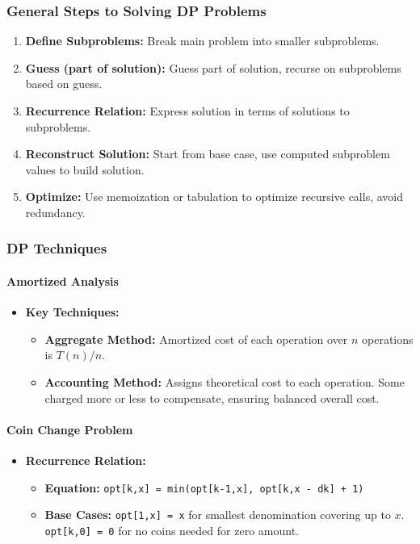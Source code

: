 \documentclass[landscape,7pt]{extarticle}
\begin{document}
\begin{multicols*}{3}
\subsubsection*{General Steps to Solving DP Problems}
\begin{enumerate}
\item \textbf{Define Subproblems:} Break main problem into smaller subproblems.
\item \textbf{Guess (part of solution):} Guess part of solution, recurse on subproblems based on guess.
\item \textbf{Recurrence Relation:} Express solution in terms of solutions to subproblems.
\item \textbf{Reconstruct Solution:} Start from base case, use computed subproblem values to build solution.
\item \textbf{Optimize:} Use memoization or tabulation to optimize recursive calls, avoid redundancy.
\end{enumerate}

\subsubsection*{DP Techniques}

\paragraph{Amortized Analysis}
\begin{itemize}
\item \textbf{Key Techniques:}
\begin{itemize}
\item \textbf{Aggregate Method:} Amortized cost of each operation over $n$ operations is $T(n)/n$.
\item \textbf{Accounting Method:} Assigns theoretical cost to each operation. Some charged more or less to compensate, ensuring balanced overall cost.
\end{itemize}
\end{itemize}

\paragraph{Coin Change Problem}
\begin{itemize}
\item \textbf{Recurrence Relation:}
\begin{itemize}
\item \textbf{Equation:} \texttt{opt[k,x] = min(opt[k-1,x], opt[k,x - dk] + 1)}
\item \textbf{Base Cases:} \texttt{opt[1,x] = x} for smallest denomination covering up to $x$. \texttt{opt[k,0] = 0} for no coins needed for zero amount.
\end{itemize}
\end{itemize}


\end{multicols*}
\end{document}
